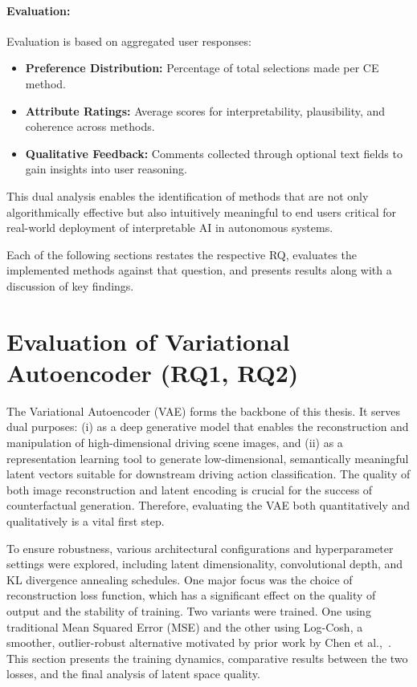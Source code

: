 \vspace{-1em}

\paragraph{Evaluation:} Evaluation is based on aggregated user responses:
    \begin{itemize}
        \item \textbf{Preference Distribution:} Percentage of total selections made per CE method.
        \item \textbf{Attribute Ratings:} Average scores for interpretability, plausibility, and coherence across methods.
        \item \textbf{Qualitative Feedback:} Comments collected through optional text fields to gain insights into user reasoning.
    \end{itemize}

This dual analysis enables the identification of methods that are not only algorithmically effective but also intuitively meaningful to end users critical for real-world deployment of interpretable AI in autonomous systems.
    


Each of the following sections restates the respective RQ, evaluates the implemented methods against that question, and presents results along with a discussion of key findings.


\section{Evaluation of Variational Autoencoder (RQ1, RQ2)} \label{sec:vae_evaluation}

The Variational Autoencoder (VAE) forms the backbone of this thesis. It serves dual purposes: (i) as a deep generative model that enables the reconstruction and manipulation of high-dimensional driving scene images, and (ii) as a representation learning tool to generate low-dimensional, semantically meaningful latent vectors suitable for downstream driving action classification. The quality of both image reconstruction and latent encoding is crucial for the success of counterfactual generation. Therefore, evaluating the VAE both quantitatively and qualitatively is a vital first step.

To ensure robustness, various architectural configurations and hyperparameter settings were explored, including latent dimensionality, convolutional depth, and KL divergence annealing schedules. One major focus was the choice of reconstruction loss function, which has a significant effect on the quality of output and the stability of training. Two variants were trained. One using traditional Mean Squared Error (MSE) and the other using Log-Cosh, a smoother, outlier-robust alternative motivated by prior work by Chen et al.,~\cite{chen2019log}. This section presents the training dynamics, comparative results between the two losses, and the final analysis of latent space quality.

